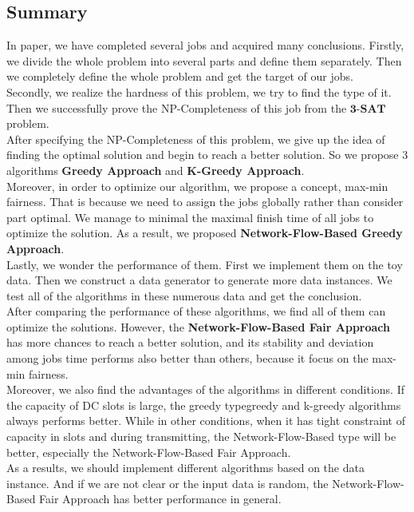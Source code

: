 \subsection{Summary}
In paper, we have completed several jobs and acquired many conclusions.
Firstly, we divide the whole problem into several parts and define them separately. Then we completely define the whole problem and get the target of our jobs.\\
Secondly, we realize the hardness of this problem, we try to find the type of it. Then we successfully prove the NP-Completeness of this job from the $\textbf{3-SAT}$ problem.\\
After specifying the NP-Completeness of this problem, we give up the idea of finding the optimal solution and begin to reach a better solution. So we propose 3 algorithms \textbf{Greedy Approach} and \textbf{K-Greedy Approach}.\\
Moreover, in order to optimize our algorithm, we propose a concept, max-min fairness. That is because we need to assign the jobs globally rather than consider part optimal. We manage to minimal the maximal finish time of all jobs to optimize the solution. As a result, we proposed \textbf{Network-Flow-Based Greedy Approach}.\\
Lastly, we wonder the performance of them. First we implement them on the toy data. Then we construct a data generator to generate more data instances. We test all of the algorithms in these numerous data and get the conclusion.\\
After comparing the performance of these algorithms, we find all of them can optimize the solutions. However, the \textbf{Network-Flow-Based Fair Approach} has more chances to reach a better solution, and its stability and deviation among jobs time performs also better than others, because it focus on the max-min fairness.\\
Moreover, we also find the advantages of the algorithms in different conditions. If the capacity of DC slots is large, the greedy type{greedy and  k-greedy} algorithms always performs better. While in other conditions, when it has tight constraint of capacity in slots and during transmitting, the Network-Flow-Based type will be better, especially the Network-Flow-Based Fair Approach.\\
As a results, we should implement different algorithms based on the data instance. And if we are not clear or the input data is random, the Network-Flow-Based Fair Approach has better performance in general. 
